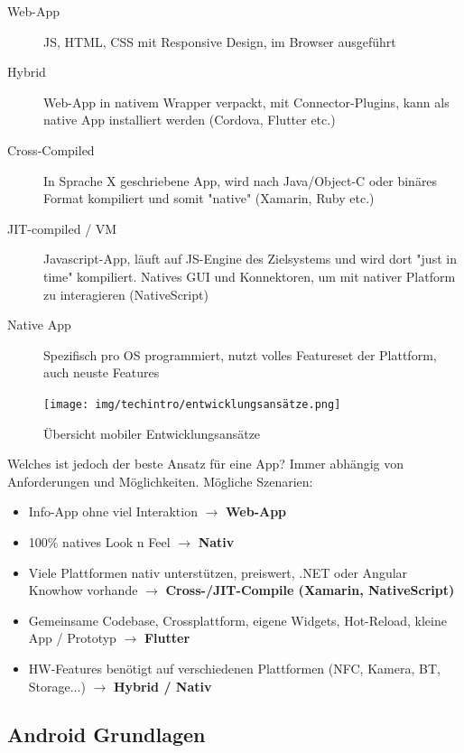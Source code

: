 \documentclass[a4paper]{article}
\begin{document}
		\begin{description}
			\item[Web-App] JS, HTML, CSS mit Responsive Design, im Browser ausgeführt
			\item[Hybrid] Web-App in nativem Wrapper verpackt, mit Connector-Plugins, kann als native App installiert werden (Cordova, Flutter etc.)
			\item[Cross-Compiled] In Sprache X geschriebene App, wird nach Java/Object-C oder binäres Format kompiliert und somit "native" (Xamarin, Ruby etc.)
			\item[JIT-compiled / VM] Javascript-App, läuft auf JS-Engine des Zielsystems und wird dort "just in time" kompiliert.
			Natives GUI und Konnektoren, um mit nativer Platform zu interagieren (NativeScript)
			\item[Native App] Spezifisch pro OS programmiert, nutzt volles Featureset der Plattform, auch neuste Features
		\end{description}
	
		\begin{figure}[htb!]
			\centering
			\texttt{[image: img/techintro/entwicklungsansätze.png]}
			\caption{Übersicht mobiler Entwicklungsansätze}
			\label{fig:techintro_entwicklungsansätze}
		\end{figure}
	
		\newpage
	
		Welches ist jedoch der beste Ansatz für eine App?
		Immer abhängig von Anforderungen und Möglichkeiten.
		Mögliche Szenarien:
		
		\begin{itemize}
			\item Info-App ohne viel Interaktion $\rightarrow$ \textbf{Web-App}
			\item 100\% natives Look n Feel $\rightarrow$ \textbf{Nativ}
			\item Viele Plattformen nativ unterstützen, preiswert, .NET oder Angular Knowhow vorhande $\rightarrow$ \textbf{Cross-/JIT-Compile (Xamarin, NativeScript)}
			\item Gemeinsame Codebase, Crossplattform, eigene Widgets, Hot-Reload, kleine App / Prototyp $\rightarrow$ \textbf{Flutter}
			\item HW-Features benötigt auf verschiedenen Plattformen (NFC, Kamera, BT, Storage...) $\rightarrow$ \textbf{Hybrid / Nativ}
		\end{itemize}
	
		\subsection{Android Grundlagen}
		
\end{document}
